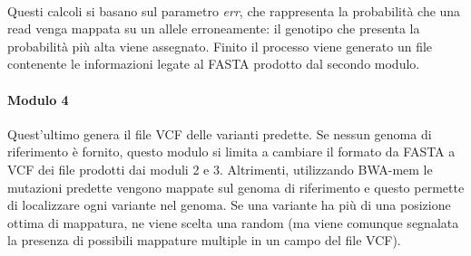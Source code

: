 \documentclass[../main.tex]{subfiles}
\begin{document}
\noindent
\\
Questi calcoli si basano sul parametro \textit{err}, che rappresenta la probabilità che una read venga mappata su un allele erroneamente: il genotipo che presenta la probabilità più alta viene assegnato. Finito il processo viene generato un file contenente le informazioni legate al FASTA prodotto dal secondo modulo.

\paragraph{Modulo 4} Quest'ultimo genera il file VCF delle varianti predette. Se nessun genoma di riferimento è fornito, questo modulo si limita a cambiare il formato da FASTA a VCF dei file prodotti dai moduli 2 e 3. Altrimenti, utilizzando BWA-mem le mutazioni predette vengono mappate sul genoma di riferimento e questo permette di localizzare ogni variante nel genoma. Se una variante ha più di una posizione ottima di mappatura, ne viene scelta una random (ma viene comunque segnalata la presenza di possibili mappature multiple in un campo del file VCF).
\end{document}
